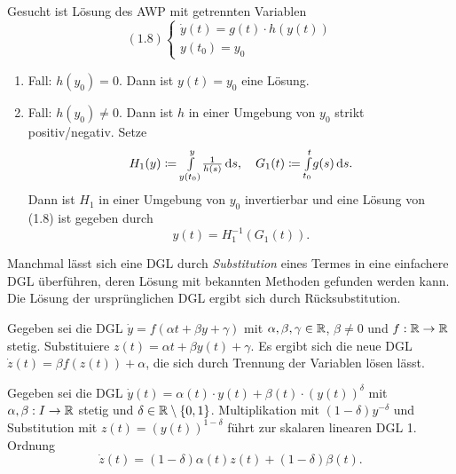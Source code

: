 \documentclass{cheat-sheet}
\begin{document}
\begin{prob}
  Gesucht ist Lösung des AWP mit getrennten Variablen
  \[
    (1.8) \left\{ \begin{array}{l}
      \dot{y}(t) = g(t) \cdot h(y(t))\\
      y(t_0) = y_0
    \end{array} \right.
  \]
\end{prob}

\begin{lsg}
  \begin{enumerate}
    \item Fall: $h(y_0) = 0$. Dann ist $y(t) = y_0$ eine Lösung.
    \item Fall: $h(y_0) \not= 0$. Dann ist $h$ in einer Umgebung von $y_0$ strikt positiv/negativ. Setze
    \[
      H_1(y) \coloneqq {\textstyle \int\limits_{y(t_0)}^{y}} \tfrac{1}{h(s)} \,\mathrm{d} s, \quad
      G_1(t) \coloneqq {\textstyle \int\limits_{t_0}^{t}} g(s) \,\mathrm{d} s.
    \]
    Dann ist $H_1$ in einer Umgebung von $y_0$ invertierbar und eine Lösung von (1.8) ist gegeben durch
    \[ y(t) = H_1^{-1}(G_1(t)). \]
  \end{enumerate}
\end{lsg}


\begin{technik}[Transformation]
  Manchmal lässt sich eine DGL durch \emph{Substitution} eines Termes in eine einfachere DGL überführen, deren Lösung mit bekannten Methoden gefunden werden kann. Die Lösung der ursprünglichen DGL ergibt sich durch Rücksubstitution.
\end{technik}

\begin{bsp}
  Gegeben sei die DGL $\dot{y} = f(\alpha t + \beta y + \gamma)$ mit $\alpha, \beta, \gamma \in \mathbb{R}$, $\beta \not= 0$ und $f : \mathbb{R} \to \mathbb{R}$ stetig. Substituiere $z(t) = \alpha t + \beta y(t) + \gamma$. Es ergibt sich die neue DGL $\dot{z}(t) = \beta f(z(t)) + \alpha$, die sich durch Trennung der Variablen lösen lässt.
\end{bsp}

\begin{bsp}
  Gegeben sei die DGL $\dot{y}(t) = \alpha(t) \cdot y(t) + \beta(t) \cdot (y(t))^{\delta}$ mit $\alpha, \beta : I \to \mathbb{R}$ stetig und $\delta \in \mathbb{R} \setminus \{0,1\}$. Multiplikation mit $(1-\delta) y^{-\delta}$ und Substitution mit $z(t) = (y(t))^{1-\delta}$ führt zur skalaren linearen DGL 1. Ordnung
  \[ \dot{z}(t) = (1-\delta) \alpha(t) z(t) + (1-\delta) \beta(t). \]
\end{bsp}
\end{document}
